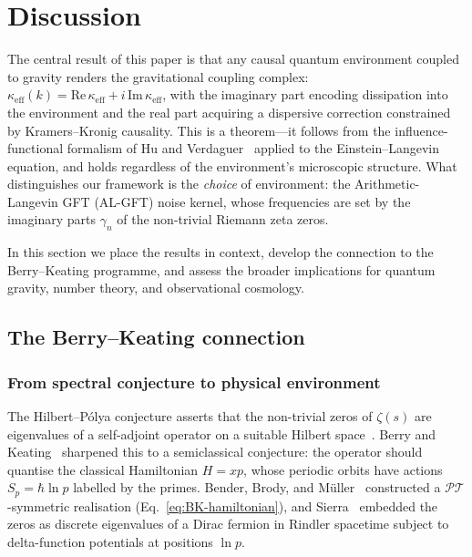 \documentclass[12pt,a4paper]{article}
\begin{document}
\section{Discussion}
\label{sec:discussion}

The central result of this paper is that any causal quantum
environment coupled to gravity renders the gravitational
coupling complex:
$\kappa_{\mathrm{eff}}(k) = \mathrm{Re}\,\kappa_{\mathrm{eff}}
+ i\,\mathrm{Im}\,\kappa_{\mathrm{eff}}$,
with the imaginary part encoding dissipation into the environment
and the real part acquiring a dispersive correction constrained
by Kramers--Kronig causality.
This is a theorem---it follows from the influence-functional
formalism of Hu and Verdaguer~\cite{HuVerdaguer2004,HuVerdaguer2008}
applied to the Einstein--Langevin equation, and holds regardless
of the environment's microscopic structure.
What distinguishes our framework is the \emph{choice} of
environment: the Arithmetic-Langevin GFT (AL-GFT) noise kernel,
whose frequencies are set by the imaginary parts $\gamma_{n}$
of the non-trivial Riemann zeta zeros.

In this section we place the results in context, develop the
connection to the Berry--Keating programme, and assess the
broader implications for quantum gravity, number theory, and
observational cosmology.


\subsection{The Berry--Keating connection}
\label{subsec:BK-connection}

\subsubsection{From spectral conjecture to physical environment}

The Hilbert--P\'olya conjecture asserts that the non-trivial
zeros of $\zeta(s)$ are eigenvalues of a self-adjoint operator
on a suitable Hilbert space~\cite{HilbertPolya}.
Berry and Keating~\cite{BerryKeating1999} sharpened this to
a semiclassical conjecture: the operator should quantise the
classical Hamiltonian $H = xp$, whose periodic orbits have
actions $S_{p} = \hbar\ln p$ labelled by the primes.
Bender, Brody, and M\"uller~\cite{Bender2017BKHamiltonian}
constructed a $\mathcal{PT}$-symmetric realisation
(Eq.~\eqref{eq:BK-hamiltonian}), and
Sierra~\cite{Sierra2014Rindler} embedded the zeros as discrete
eigenvalues of a Dirac fermion in Rindler spacetime subject to
delta-function potentials at positions $\ln p$.
\end{document}
